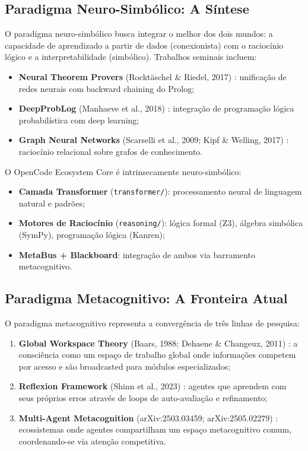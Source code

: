 \subsection{Paradigma Neuro-Simbólico: A Síntese}

O paradigma neuro-simbólico busca integrar o melhor dos dois mundos: a capacidade de aprendizado a partir de dados (conexionista) com o raciocínio lógico e a interpretabilidade (simbólico). Trabalhos seminais incluem:

\begin{itemize}
    \item \textbf{Neural Theorem Provers} (Rocktäschel \& Riedel, 2017) \cite{rocktaschel2017end}: unificação de redes neurais com backward chaining do Prolog;
    \item \textbf{DeepProbLog} (Manhaeve et al., 2018) \cite{manhaeve2018deepproblog}: integração de programação lógica probabilística com deep learning;
    \item \textbf{Graph Neural Networks} (Scarselli et al., 2009; Kipf \& Welling, 2017) \cite{kipf2017semi}: raciocínio relacional sobre grafos de conhecimento.
\end{itemize}

O OpenCode Ecosystem Core é intrinsecamente neuro-simbólico:
\begin{itemize}
    \item \textbf{Camada Transformer} (\texttt{transformer/}): processamento neural de linguagem natural e padrões;
    \item \textbf{Motores de Raciocínio} (\texttt{reasoning/}): lógica formal (Z3), álgebra simbólica (SymPy), programação lógica (Kanren);
    \item \textbf{MetaBus + Blackboard}: integração de ambos via barramento metacognitivo.
\end{itemize}

\subsection{Paradigma Metacognitivo: A Fronteira Atual}

O paradigma metacognitivo representa a convergência de três linhas de pesquisa:

\begin{enumerate}
    \item \textbf{Global Workspace Theory} (Baars, 1988; Dehaene \& Changeux, 2011) \cite{baars1988cognitive, dehaene2011experimental}: a consciência como um espaço de trabalho global onde informações competem por acesso e são broadcasted para módulos especializados;
    \item \textbf{Reflexion Framework} (Shinn et al., 2023) \cite{shinn2023reflexion}: agentes que aprendem com seus próprios erros através de loops de auto-avaliação e refinamento;
    \item \textbf{Multi-Agent Metacognition} (arXiv:2503.03459; arXiv:2505.02279) \cite{unifiedmind2025, a2a2025}: ecossistemas onde agentes compartilham um espaço metacognitivo comum, coordenando-se via atenção competitiva.
\end{enumerate}

